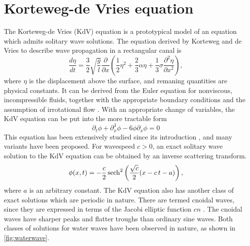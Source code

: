 \documentclass[thesis2.tex]{subfiles}
\begin{document}
\section{Korteweg-de Vries equation}

The Korteweg-de Vries (KdV) equation is a prototypical model of an equation which admits solitary wave solutions. The equation derived by Korteweg and de Vries \cite{KdVoriginal} to describe wave propagation in a rectangular canal is  
\[
\frac{d \eta}{dt} = \frac{3}{2} \sqrt{\frac{g}{l}}
\frac{\partial}{\partial x}
\left( \frac{1}{2} \eta^2 + \frac{2}{3} \alpha \eta + \frac{1}{3} \sigma \frac{\partial^2 \eta}{\partial x^2}\right),
\]
where $\eta$ is the displacement above the surface, and remaning quantities are physical constants. It can be derived from the Euler equation for nonviscous, incompressible fluids, together with the appropriate boundary conditions and the assumption of irrotational flow \cite{SolitonPhysics}. With an appropriate change of variables, the KdV equation can be put into the more tractable form
\begin{equation}\label{KdV3}
\partial_t \phi + \partial_x^3 \phi - 6 \phi \partial_x \phi = 0
\end{equation}
This equation has been extensively studied since its introduction \cite{miles1981,drazin1989solitons,SolitonPhysics}, and many variants have been proposed. For wavespeed $c > 0$, an exact solitary wave solution to the KdV equation can be obtained by an inverse scattering transform.
\[
\phi (x,t)=-{\frac {c}{2}}\,\mathrm {sech} ^{2}\left({{\sqrt {c}} \over 2}(x-c\,t-a)\right),
\]
where $a$ is an arbitrary constant. The KdV equation also has another class of exact solutions which are periodic in nature. There are termed cnoidal waves, since they are expressed in terms of the Jacobi elliptic function $cn$ \cite{drazin1989solitons}. The cnoidal waves have sharper peaks and flatter troughs than ordinary sine waves. Both classes of solutions for water waves have been observed in nature, as shown in \cref{fig:waterwave}.
\end{document}
